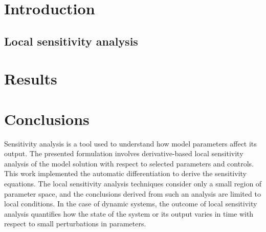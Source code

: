 \documentclass[a4paper,fleqn]{cas-dc}
\begin{document}
\maketitle


\section{Introduction}








\subsection{Local sensitivity analysis} \label{CH: Sensitivity_Analysis}



\section{Results}


\section{Conclusions} \label{CH: Conclusion}

Sensitivity analysis is a tool used to understand how model parameters affect its output. The presented formulation involves derivative-based local sensitivity analysis of the model solution with respect to selected parameters and controls. This work implemented the automatic differentiation to derive the sensitivity equations. The local sensitivity analysis techniques consider only a small region of parameter space, and the conclusions derived from such an analysis are limited to local conditions. In the case of dynamic systems, the outcome of local sensitivity analysis quantifies how the state of the system or its output varies in time with respect to small perturbations in parameters.
\end{document}
